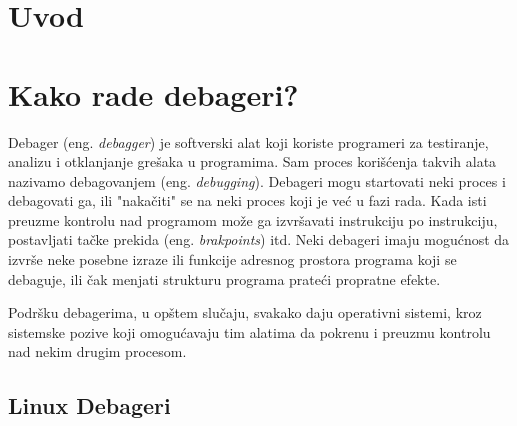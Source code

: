 \documentclass[12pt,oneside]{memoir}
\begin{document}
\frontmatter
\naslovna
\komisija
\apstrakt
\tableofcontents*

\mainmatter

\chapter{Uvod}


\chapter{Kako rade debageri?}
\label{chp:debageri}

Debager (eng. \emph{debagger}) je softverski alat koji koriste programeri za testiranje, analizu i otklanjanje grešaka u programima. Sam proces korišćenja takvih alata nazivamo debagovanjem (eng. \emph{debugging}).
Debageri mogu startovati neki proces i debagovati ga, ili "nakačiti" se na neki proces koji je već u fazi rada. Kada isti preuzme kontrolu nad programom može ga izvršavati instrukciju po instrukciju, postavljati tačke prekida (eng. \emph{brakpoints}) itd. Neki debageri imaju mogućnost da izvrše neke posebne izraze ili funkcije adresnog prostora programa koji se debaguje, ili čak menjati strukturu programa prateći propratne efekte.

Podršku debagerima, u opštem slučaju, svakako daju operativni sistemi, kroz sistemske pozive koji omogućavaju tim alatima da pokrenu i preuzmu kontrolu nad nekim drugim procesom.

\section{Linux Debageri}
\end{document}
